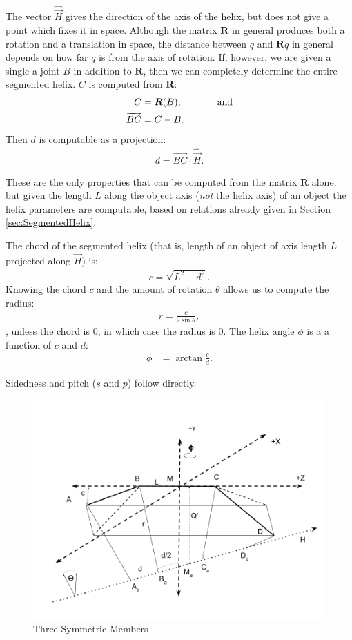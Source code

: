 \documentclass[mathematics,article,submit,pdftex,moreauthors]{Definitions/mdpi}
\begin{document}
The vector $\hat{\overrightarrow{H}}$ gives the direction of the
axis of the helix, but does not give a point which fixes
it in space.
Although the matrix $\bm{R}$ in general produces both a rotation
and a translation in space, the distance between $q$ and $\bm{R}q$
in general depends on how far $q$ is from the axis of rotation.
If, however, we are given a single a joint $B$ in addition to
$\bm{R}$, then we can completely determine the entire segmented helix.
$C$ is computed from $\bm{R}$:
\begin{align}
  C &= \bm{R}(B), \text{ \hspace{3em} and}\\
 \overrightarrow{BC} &= C - B. \\
\end{align}
Then $d$ is computable as a projection:
\begin{align}
  d = \overrightarrow{BC} \cdot \hat{\overrightarrow{H}}.
\end{align}

These are the only properties that can be computed from the
matrix $\bm{R}$ alone, but given the length $L$ along the
object axis ({\em not} the helix axis) of an object
the helix parameters are computable, based on relations
already given in Section \ref{sec:SegmentedHelix}.

The chord of the segmented helix (that is, length of an object of
axis length $L$
projected along $\overrightarrow{H}$) is:
\begin{align}
  c = \sqrt{L^2 - d^2}.
\end{align}
Knowing the chord $c$ and the amount of rotation $\theta$
allows us to compute the radius:
\begin{align}
  r = \frac{c}{2 \sin{\theta}},
\end{align},
unless the chord is $0$, in which case the radius is $0$.
The helix angle $\phi$ is a a function of $c$ and $d$:
\begin{align}
    \phi &= \arctan{\frac{c}{d}}.
\end{align}

Sidedness and pitch ($s$ and $p$) follow directly.


\begin{figure}
  \centering
  \captionsetup{justification=centering}
     \includegraphics[width=10 cm]{figures/ThreeMemberDiagram.png}
     \caption{Three Symmetric Members}
  \label{fig:threemembersdiagram}
\end{figure}
\unskip
\end{document}

